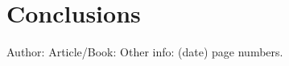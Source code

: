 \documentclass{llncs}
\begin{document}
\section{Conclusions}




%
%

\begin{thebibliography}{1}
Author:
Article/Book:
Other info: (date) page numbers.
\end{thebibliography}
\end{document}
